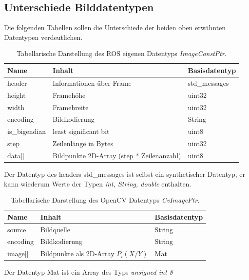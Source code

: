 		\subsection{Unterschiede Bilddatentypen}
		Die folgenden Tabellen sollen die Unterschiede der beiden oben erwähnten Datentypen verdeutlichen.
\begin{table}[H]
\begin{tabular}{|l|l|l|}
\hline \rule[-2ex]{0pt}{5.5ex} Name & Inhalt & Basisdatentyp \\ 
\hline \rule[-2ex]{0pt}{5.5ex} header & Informationen über Frame & std\_messages \\ 
\hline \rule[-2ex]{0pt}{5.5ex} height & Framehöhe & uint32\\ 
\hline \rule[-2ex]{0pt}{5.5ex} width & Framebreite & uint32\\  
\hline \rule[-2ex]{0pt}{5.5ex} encoding & Bildkodierung & String\\  
\hline \rule[-2ex]{0pt}{5.5ex} is\_bigendian & least significant bit & uint8\\ 
\hline \rule[-2ex]{0pt}{5.5ex} step & Zeilenlänge in Bytes & uint32\\ 
\hline \rule[-2ex]{0pt}{5.5ex} data[] & Bildpunkte 2D-Array (step * Zeilenanzahl) & uint8\\ 
\hline
\end{tabular}
\caption{Tabellarische Darstellung des ROS eigenen Datentyps \textit{ImageConstPtr}.} 
\end{table}
Der Datentyp des headers std\_messages ist selbst ein synthetischer Datentyp, er kann wiederum Werte der Typen \textit{int, String, double} enthalten.
\begin{table}[H]
\begin{tabular}{|l|l|l|}
\hline Name & Inhalt & Basisdatentyp\\ 
\hline source & Bildquelle & String\\
\hline encoding & Bildkodierung & String\\
\hline image[] & Bildpunkte als 2D-Array $P_i(X/Y)$ & Mat\\
\hline
\end{tabular}
\caption{Tabellarische Darstellung des OpenCV Datentyps \textit{CvImagePtr}.}
\end{table}
Der Datentyp Mat ist ein Array des Typs \textit{unsigned int 8}
 				 
		

